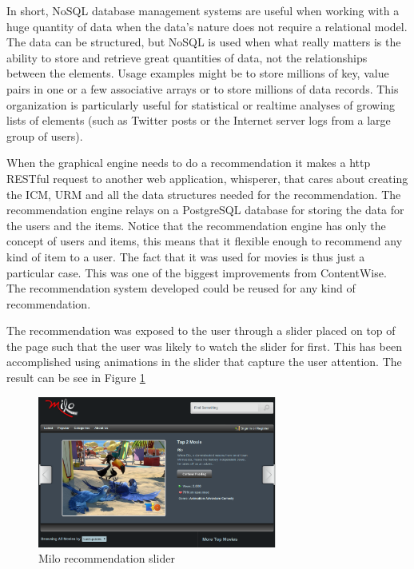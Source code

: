 In short, NoSQL database management systems are useful when working with a huge quantity of data when the data's nature does not require a relational model. The data can be structured, but NoSQL is used when what really matters is the ability to store and retrieve great quantities of data, not the relationships between the elements. Usage examples might be to store millions of key, value pairs in one or a few associative arrays or to store millions of data records. This organization is particularly useful for statistical or realtime analyses of growing lists of elements (such as Twitter posts or the Internet server logs from a large group of users).

When the graphical engine needs to do a recommendation it makes a http RESTful request to another web application, whisperer, that cares about creating the \ac{ICM}, \ac{URM} and all the data structures needed for the recommendation. The recommendation engine relays on a PostgreSQL database for storing the data for the users and the items. Notice that the recommendation engine has only the concept of users and items, this means that it flexible enough to recommend any kind of item to a user. The fact that it was used for movies is thus just a particular case. This was one of the biggest improvements from ContentWise. The recommendation system developed could be reused for any kind of recommendation.

The recommendation was exposed to the user through a slider placed on top of the page such that the user was likely to watch the slider for first. This has been accomplished using animations in the slider that capture the user attention. The result can be see in Figure \ref{fig:milo_slider} 

\begin{figure}
  \centering
  \includegraphics[width=0.7\textwidth]{figures/milo_slider.png}
  \caption{Milo recommendation slider}
  \label{fig:milo_slider}
\end{figure}

